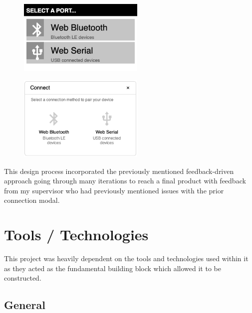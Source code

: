 \documentclass{l4proj}
\begin{document}
\begin{figure}[!ht]
\centering
\begin{minipage}{.5\textwidth}
  \centering
  \includegraphics[width=6cm]{dissertation/images/old-modal-design.png}
  \label{fig:old-connection-modal}
\end{minipage}%
\begin{minipage}{.5\textwidth}
  \centering
  \includegraphics[width=6cm]{dissertation/images/new-modal-design.png}
  \label{fig:new-connection-modal}
\end{minipage}
\end{figure}

This design process incorporated the previously mentioned feedback-driven approach going through many iterations to reach a final product with feedback from my supervisor who had previously mentioned issues with the prior connection modal.


\chapter{Tools / Technologies}

This project was heavily dependent on the tools and technologies used within it as they acted as the fundamental building block which allowed it to be constructed.

\section{General}
\end{document}
